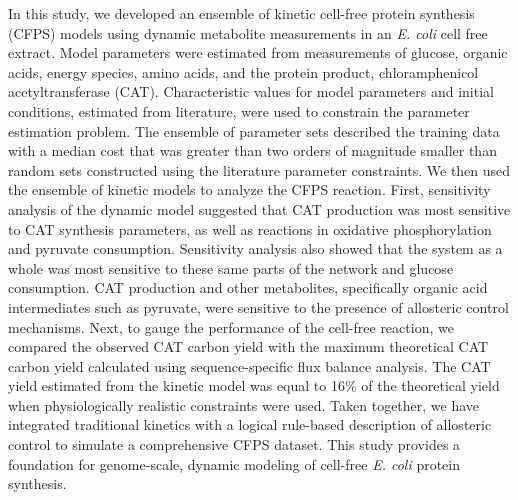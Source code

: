 \documentclass[12pt]{article}
\begin{document}
In this study, we developed an ensemble of kinetic cell-free protein synthesis (CFPS) models using dynamic metabolite measurements in an \textit{E. coli} cell free extract.
Model parameters were estimated from measurements of glucose, organic acids, energy species, amino acids, and the protein product, chloramphenicol acetyltransferase (CAT).
Characteristic values for model parameters and initial conditions, estimated from literature, were used to constrain the parameter estimation problem.
The ensemble of parameter sets described the training data with a median cost that was greater than two orders of magnitude smaller than random sets constructed using the literature parameter constraints. We then used the ensemble of kinetic models to analyze the CFPS reaction.
First, sensitivity analysis of the dynamic model suggested that CAT production was most sensitive to CAT synthesis parameters, as well as reactions in oxidative phosphorylation and pyruvate consumption.
Sensitivity analysis also showed that the system as a whole was most sensitive to these same parts of the network and glucose consumption.
CAT production and other metabolites, specifically organic acid intermediates such as pyruvate, were sensitive to the presence of allosteric control mechanisms.
Next, to gauge the performance of the cell-free reaction, we compared the observed CAT carbon yield with the maximum theoretical CAT carbon yield calculated using sequence-specific flux balance analysis. The CAT yield estimated from the kinetic model was equal to 16\% of the theoretical yield when physiologically realistic constraints were used.
Taken together, we have integrated traditional kinetics with a logical rule-based description of allosteric control to simulate a comprehensive CFPS dataset.
This study provides a foundation for genome-scale, dynamic modeling of cell-free \textit{E. coli} protein synthesis.
\end{document}
